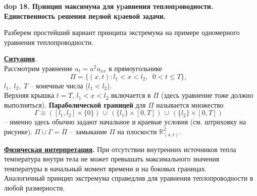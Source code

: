 \setcounter{section}{4}
\setcounter{subsection}{18}
\setcounter{equation}{0}
\textbf{\LARGE dop 18. Пpинцип максимума для уpавнения теплопpоводности. Единственность pешения пеpвой кpаевой задачи.}

Разберем простейший вариант принципа экстремума на примере одномерного уравнения теплопроводности. 

\noindent\underline{\textbf{Ситуация}}.\\[2mm] Рассмотрим уравнение $u_t = a^2 u_{xx}$ в  прямоугольнике $$\Pi = \{(x, t): l_1 < x < l_2,\;\; 0 < t \leq T \},$$ 
 \;\; $l_1,\; l_2,\; T$ -- конечные числа ($l_1 < l_2$).
\\ Верхняя крышка $t = T$, \;$l_1 < x < l_2$ включается в $\Pi$ (здесь уравнение тоже должно выполняться). \newline
\textbf{Параболической границей} для $\Pi$ называется множество $$\Gamma \equiv \left( [l_1, l_2] \times \{0\} \right)\, \cup\, \left( \{l_1\} \times [0, T] \right) \,\cup\, \left( \{l_2\} \times [0, T] \right)$$ -- именно здесь обычно задают начальное и краевые условия (см. штриховку на рисунке).\newline\newline
$\Pi \cup \Gamma = \overline{\Pi}$ -- замыкание $\Pi$ на плоскости $\mathbb{R}^2_{(x, t)}$.\newline


\noindent \textbf{\underline{Физическая интерпретация}.} При отсутствии внутренних источников тепла температура внутри тела не может превышать максимального значения температуры в начальный момент времени и на боковых границах. \\[2mm]
  Аналогичный принцип экстремума справедлив для уравнения теплопроводности в любой размерности.

